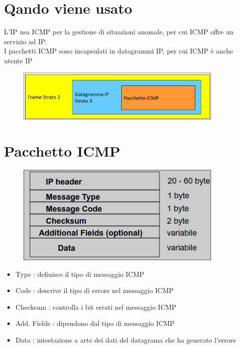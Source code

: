 \documentclass{report}
\begin{document}
        \section{Qando viene usato}
            L'IP usa ICMP per la gestione di situazioni anomale, per cui ICMP offre un servizio ad IP.
            \\
            I pacchetti ICMP sono incapsulati in datagrammi IP, per cui ICMP è anche utente IP
            \\
            \begin{figure}[H]
                \includegraphics[width=0.9\textwidth]{1/ICMP.png}
            \end{figure}
        \section{Pacchetto ICMP}
            \begin{figure}[H]
                \includegraphics[width=0.9\textwidth]{1/pacICMP.png}
            \end{figure}
            \begin{itemize}
                \item Type : definisce il tipo di messaggio ICMP
                \item Code : descrive il tipo di errore nel messaggio ICMP
                \item Checksum : controlla i bit errati nel messaggio ICMP
                \item Add. Fields : dipendono dal tipo di messaggio ICMP
                \item Data : intestazione a arte dei dati del datagrama che ha generato l'errore
            \end{itemize}
\end{document}
